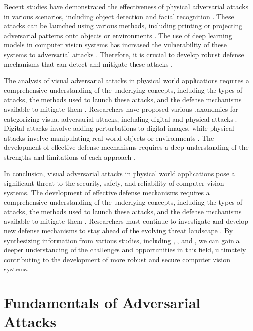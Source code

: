 \documentclass[11pt,a4paper]{article}
\begin{document}
Recent studies have demonstrated the effectiveness of physical adversarial attacks in various scenarios, including object detection \cite{arxiv:1906.11897} and facial recognition \cite{doi:10.1609/aaai.v32i1.12341}. These attacks can be launched using various methods, including printing or projecting adversarial patterns onto objects or environments \cite{arxiv:2007.04137}. The use of deep learning models in computer vision systems has increased the vulnerability of these systems to adversarial attacks \cite{doi:10.1109/access.2022.3208131}. Therefore, it is crucial to develop robust defense mechanisms that can detect and mitigate these attacks \cite{doi:10.1109/asp-dac47756.2020.9045584}.

The analysis of visual adversarial attacks in physical world applications requires a comprehensive understanding of the underlying concepts, including the types of attacks, the methods used to launch these attacks, and the defense mechanisms available to mitigate them \cite{doi:10.1007/s11633-019-1211-x}. Researchers have proposed various taxonomies for categorizing visual adversarial attacks, including digital and physical attacks \cite{doi:10.24963/ijcai.2021/694}. Digital attacks involve adding perturbations to digital images, while physical attacks involve manipulating real-world objects or environments \cite{arxiv:1707.08945}. The development of effective defense mechanisms requires a deep understanding of the strengths and limitations of each approach \cite{arxiv:2102.01356}.

In conclusion, visual adversarial attacks in physical world applications pose a significant threat to the security, safety, and reliability of computer vision systems. The development of effective defense mechanisms requires a comprehensive understanding of the underlying concepts, including the types of attacks, the methods used to launch these attacks, and the defense mechanisms available to mitigate them \cite{doi:10.1016/j.eng.2019.12.012}. Researchers must continue to investigate and develop new defense mechanisms to stay ahead of the evolving threat landscape \cite{doi:10.1145/3459637.3482029}. By synthesizing information from various studies, including \cite{doi:10.24963/ijcai.2021/694}, \cite{arxiv:1707.08945}, and \cite{doi:10.1109/access.2022.3208131}, we can gain a deeper understanding of the challenges and opportunities in this field, ultimately contributing to the development of more robust and secure computer vision systems.


\section{Fundamentals of Adversarial Attacks}
\end{document}
